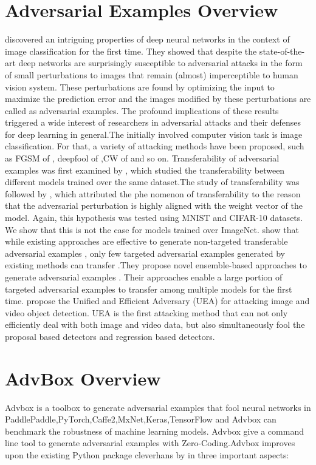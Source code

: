 \documentclass{article}
\begin{document}
\section{Adversarial Examples Overview}
\cite{Szegedy2013Intriguing} discovered an intriguing properties of deep neural networks in the context of image classification for the first time. They showed that despite the state-of-the-art deep networks are surprisingly susceptible to adversarial attacks in the form of small perturbations to images that remain (almost) imperceptible to human vision system. These perturbations are found by optimizing the input to maximize the prediction error and the images modified by these perturbations are called as adversarial examples. The profound implications of these results triggered a wide interest of researchers in adversarial attacks and their defenses for deep learning in general.The initially involved computer vision task is image classification. For that, a variety of attacking methods have been proposed, such as  FGSM of \cite{goodfellow2014explaining}, deepfool of \cite{Moosavidezfooli2016DeepFool} ,CW of \cite{Carlini2017Towards}  and so on. Transferability of adversarial examples was first examined by \cite{Szegedy2013Intriguing}, which studied the transferability between different models trained over the same dataset.The study of transferability was followed by \cite{goodfellow2014explaining}, which attributed the phe nomenon of transferability to the reason that the adversarial perturbation is highly aligned with the weight vector of the model. Again, this hypothesis was tested using MNIST and CIFAR-10 datasets. We show that this is not the case for models trained over ImageNet.\cite{Liu2016Delving} show that while existing approaches are effective to generate non-targeted transferable adversarial examples , only few targeted adversarial examples generated by existing methods can transfer .They propose novel ensemble-based approaches to generate adversarial examples . Their approaches enable a large portion of targeted adversarial examples to transfer among multiple models for the first time.\cite{wei2018transferable} propose the Unified and Efficient Adversary (UEA) for attacking image and video object detection. UEA is the first attacking method that can not only efficiently deal with both image and video data, but also simultaneously fool the proposal based detectors and regression based detectors.

\section{AdvBox Overview}
Advbox is a toolbox to generate adversarial examples that fool neural networks in PaddlePaddle,PyTorch,Caffe2,MxNet,Keras,TensorFlow and Advbox can benchmark the robustness of machine learning models.  Advbox give a command line tool to generate adversarial examples with Zero-Coding.Advbox improves upon the existing Python package cleverhans by \cite{Papernot2016cleverhans} in three important aspects:
\end{document}
